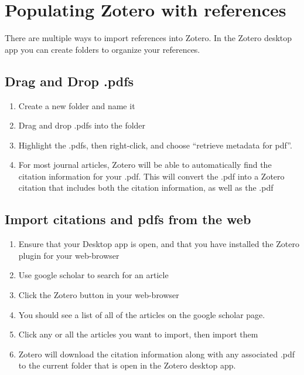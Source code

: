\documentclass[
]{book}
\providecommand{\tightlist}{%
  \setlength{\itemsep}{0pt}\setlength{\parskip}{0pt}}
\begin{document}
\hypertarget{populating-zotero-with-references}{%
\section{Populating Zotero with references}\label{populating-zotero-with-references}}

There are multiple ways to import references into Zotero. In the Zotero desktop app you can create folders to organize your references.

\hypertarget{drag-and-drop-.pdfs}{%
\subsection{Drag and Drop .pdfs}\label{drag-and-drop-.pdfs}}

\begin{enumerate}
\def\labelenumi{\arabic{enumi}.}
\tightlist
\item
  Create a new folder and name it
\item
  Drag and drop .pdfs into the folder
\item
  Highlight the .pdfs, then right-click, and choose ``retrieve metadata for pdf''.
\item
  For most journal articles, Zotero will be able to automatically find the citation information for your .pdf. This will convert the .pdf into a Zotero citation that includes both the citation information, as well as the .pdf
\end{enumerate}

\hypertarget{import-citations-and-pdfs-from-the-web}{%
\subsection{Import citations and pdfs from the web}\label{import-citations-and-pdfs-from-the-web}}

\begin{enumerate}
\def\labelenumi{\arabic{enumi}.}
\tightlist
\item
  Ensure that your Desktop app is open, and that you have installed the Zotero plugin for your web-browser
\item
  Use google scholar to search for an article
\item
  Click the Zotero button in your web-browser
\item
  You should see a list of all of the articles on the google scholar page.
\item
  Click any or all the articles you want to import, then import them
\item
  Zotero will download the citation information along with any associated .pdf to the current folder that is open in the Zotero desktop app.
\end{enumerate}
\end{document}
